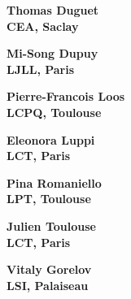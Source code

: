 \documentclass[20pt]{beamer}
\begin{document}
\begin{frame}
	\begin{center}
		\huge \bf Thomas Duguet
		\\
		\vspace{20mm}
		\large CEA, Saclay
	\end{center}
\end{frame}


\begin{frame}
	\begin{center}
		\huge \bf Mi-Song Dupuy
		\\
		\vspace{20mm}
		\large LJLL, Paris
	\end{center}
\end{frame}


\begin{frame}
	\begin{center}
		\huge \bf Pierre-Francois Loos
		\\
		\vspace{20mm}
		\large LCPQ, Toulouse
	\end{center}
\end{frame}

\begin{frame}
	\begin{center}
		\huge \bf Eleonora Luppi
		\\
		\vspace{20mm}
		\large LCT, Paris
	\end{center}
\end{frame}

\begin{frame}
	\begin{center}
		\huge \bf Pina Romaniello
		\\
		\vspace{20mm}
		\large LPT, Toulouse
	\end{center}
\end{frame}

\begin{frame}
	\begin{center}
		\huge \bf Julien Toulouse
		\\
		\vspace{20mm}
		\large LCT, Paris
	\end{center}
\end{frame}

\begin{frame}
	\begin{center}
		\huge \bf Vitaly Gorelov
		\\
		\vspace{20mm}
		\large LSI, Palaiseau
	\end{center}
\end{frame}
\end{document}
